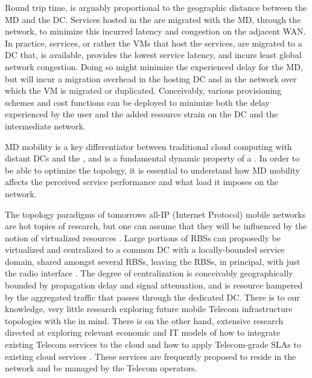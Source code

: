 Round trip time, is arguably proportional to the geographic distance between the \ac{MD} and the \ac{DC}. Services hosted in the \xcloud{} are migrated with the \ac{MD}, through the network, to minimize this incurred latency and congestion on the adjacent WAN. In practice, services, or rather the VMs that host the services, are migrated to a \ac{DC} that, is available, provides the lowest service latency, and incurs least global network congestion. Doing so might minimize the experienced delay for the \ac{MD}, but will incur a migration overhead in the hosting \ac{DC} and in the network over which the VM is migrated or duplicated. Conceivably, various provisioning schemes and cost functions can be deployed to minimize both the delay experienced by the user and the added resource strain on the \ac{DC} and the intermediate network.

\ac{MD} mobility is a key differentiator between traditional cloud computing with distant \ac{DC}s and the \xcloud{}, and is a fundamental dynamic property of a \xcloud{}. In order to be able to optimize the \xcloud{} topology, it is essential to understand how \ac{MD} mobility affects the perceived service performance and what load it imposes on the network.

The topology paradigms of tomorrows all-IP (Internet Protocol) mobile networks \cite{6144211,5357099} are hot topics of research, but one can assume that they will be influenced by the notion of virtualized resources \cite{baroncelli2010network, chowdhury2009network}. Large portions of \ac{RBS}s can proposedly be virtualized and centralized to a common \ac{DC} with a locally-bounded service domain, shared amongst several \ac{RBS}s, leaving the \ac{RBS}s, in principal, with just the radio interface \cite{melzercloud}. The degree of centralization is conceivably geographically bounded by propagation delay and signal attenuation, and is resource hampered by the aggregated traffic that passes through the dedicated \ac{DC}. There is to our knowledge, very little research exploring future mobile Telecom infrastructure topologies with the \xcloud{} in mind. There is on the other hand, extensive research directed at exploring relevant economic and IT models of how to integrate existing Telecom services to the cloud and how to apply Telecom-grade SLAs to existing cloud services \cite{EricssonWhitePaper,6156350, 5357099}. These services are frequently proposed to reside in the network and be managed by the Telecom operators.

